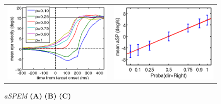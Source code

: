 \documentclass[profile,final,english, draft]{article}%
\begin{document}
\begin{figure}%
\begin{tabular}{cc} 
    \includegraphics[width=.49\linewidth]{image_anna_1} & 	\includegraphics[width=.49\linewidth]{image_anna_2}
\end{tabular}
\caption{\emph{aSPEM} \textbf{(A)} 
\textbf{(B)} 
\textbf{(C)}  }
\label{fig:intro}
\end{figure}
\end{document}

